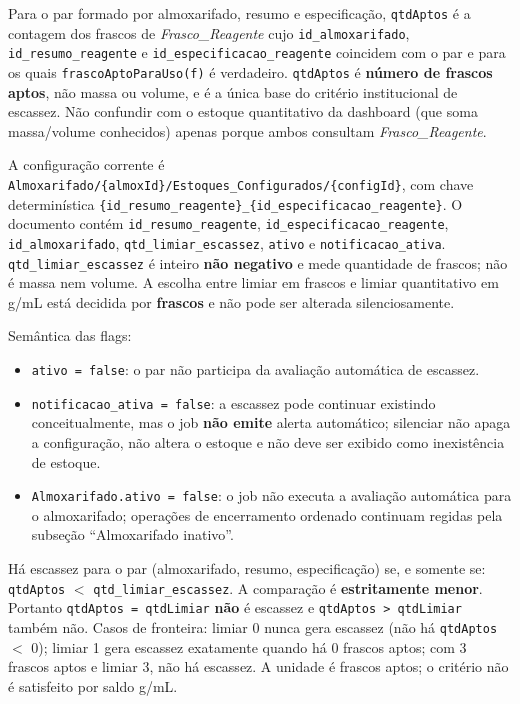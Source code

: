 \begin{regra}
Para o par formado por almoxarifado, resumo e especificação, \texttt{qtdAptos} é a contagem dos frascos de \textit{Frasco\_Reagente} cujo \texttt{id\_almoxarifado}, \texttt{id\_resumo\_reagente} e \texttt{id\_especificacao\_reagente} coincidem com o par e para os quais \texttt{frascoAptoParaUso(f)} é verdadeiro.
\texttt{qtdAptos} é \textbf{número de frascos aptos}, não massa ou volume, e é a única base do critério institucional de escassez. Não confundir com o estoque quantitativo da dashboard (que soma massa/volume conhecidos) apenas porque ambos consultam \textit{Frasco\_Reagente}.
\end{regra}

\begin{regra}
A configuração corrente é \texttt{Almoxarifado/\{almoxId\}/Estoques\_Configurados/\{configId\}}, com chave determinística \texttt{\{id\_resumo\_reagente\}\_\{id\_especificacao\_reagente\}}. O documento contém \texttt{id\_resumo\_reagente}, \texttt{id\_especificacao\_reagente}, \texttt{id\_almoxarifado}, \texttt{qtd\_limiar\_escassez}, \texttt{ativo} e \texttt{notificacao\_ativa}. \texttt{qtd\_limiar\_escassez} é inteiro \textbf{não negativo} e mede quantidade de frascos; não é massa nem volume. A escolha entre limiar em frascos e limiar quantitativo em g/mL está decidida por \textbf{frascos} e não pode ser alterada silenciosamente.

Semântica das flags:
\begin{itemize}
    \item \texttt{ativo = false}: o par não participa da avaliação automática de escassez.
    \item \texttt{notificacao\_ativa = false}: a escassez pode continuar existindo conceitualmente, mas o job \textbf{não emite} alerta automático; silenciar não apaga a configuração, não altera o estoque e não deve ser exibido como inexistência de estoque.
    \item \texttt{Almoxarifado.ativo = false}: o job não executa a avaliação automática para o almoxarifado; operações de encerramento ordenado continuam regidas pela subseção ``Almoxarifado inativo''.
\end{itemize}
\end{regra}

\begin{regra}
Há escassez para o par (almoxarifado, resumo, especificação) se, e somente se:
\texttt{qtdAptos} $<$ \texttt{qtd\_limiar\_escassez}.
A comparação é \textbf{estritamente menor}. Portanto \texttt{qtdAptos = qtdLimiar} \textbf{não} é escassez e \texttt{qtdAptos > qtdLimiar} também não. Casos de fronteira: limiar $0$ nunca gera escassez (não há \texttt{qtdAptos} $<$ 0); limiar 1 gera escassez exatamente quando há 0 frascos aptos; com 3 frascos aptos e limiar 3, não há escassez. A unidade é frascos aptos; o critério não é satisfeito por saldo g/mL.
\end{regra}

